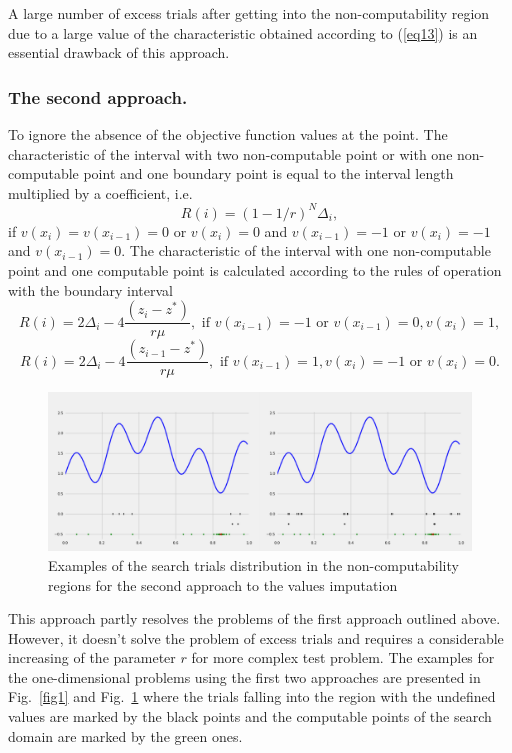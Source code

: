 \documentclass[runningheads]{llncs}
\begin{document}
A large number of excess trials after getting into the non-computability region due to a large value of the characteristic obtained according to (\ref{eq13}) is an essential drawback of this approach.

\subsubsection{The second approach.} To ignore the absence of the objective function values at the point. The characteristic of the interval with two non-computable point or with one non-computable point and one boundary point is equal to the interval length multiplied by a coefficient, i.e.
\begin{equation}\label{eq14} 
R(i)={(1-{1}/{r})}^N \Delta _i,
\end{equation}
if $v(x_i)=v(x_{i-1})=0$ or $v(x_i)=0$ and $v(x_{i-1})=-1$ or $v(x_i)=-1$ and $v(x_{i-1})=0$.
The characteristic of the interval with one non-computable point and one computable point is calculated according to the rules of operation with the boundary interval
\begin{equation}\label{eq15} 
R(i)=2\Delta _i-4 \frac {(z_i-z^*)}{r \mu},\text{ if } v(x_{i-1})=-1  \text{ or } v(x_{i-1})=0, v(x_i)=1,
\end{equation}
\begin{equation}\label{eq16} 
R(i)=2\Delta _i-4 \frac {(z_{i-1}-z^*)}{r \mu},\text{ if } v(x_{i-1})=1, v(x_i)=-1 \text{ or } v(x_i)=0.
\end{equation}

\begin{figure}
\includegraphics[width=\textwidth]{fig2.png}
\caption{Examples of the search trials distribution in the non-computability regions for the second approach to the values imputation} \label{fig2}
\end{figure}

This approach partly resolves the problems of the first approach outlined above. However, it doesn’t solve the problem of excess trials and requires a considerable increasing of the parameter $r$ for more complex test problem. The examples for the one-dimensional problems using the first two approaches are presented in Fig.~\ref{fig1} and Fig.~\ref{fig2} where the trials falling into the region with the undefined values are marked by the black points and the computable points of the search domain are marked by the green ones. 
\end{document}
